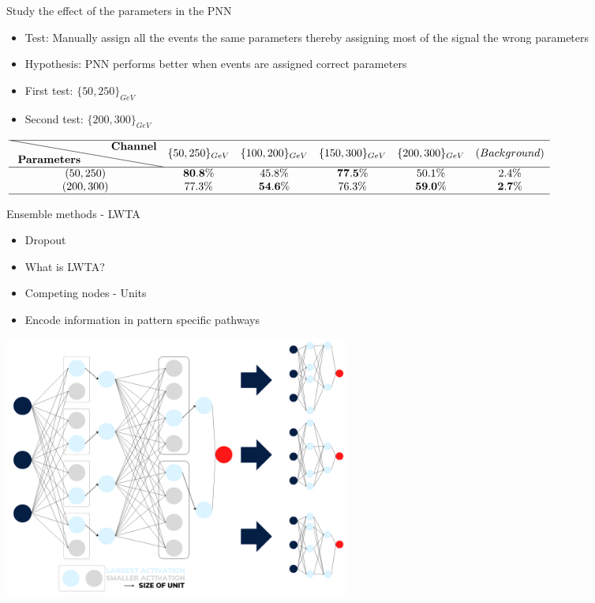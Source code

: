 \documentclass[UKenglish]{beamer}
\begin{document}
\begin{frame}{Study the effect of the parameters in the PNN}
    \begin{itemize}
        \item Test: Manually assign all the events the same parameters thereby assigning
        most of the signal the wrong parameters
        \item Hypothesis: PNN performs better when events are assigned correct
        parameters 
        \item First test: $\{50,250\}_{GeV}$
        \item Second test: $\{200,300\}_{GeV}$
    \end{itemize}
    \begin{table}
        \tiny
        \centering
        $
        \begin{array}{cccccc}
            \hline \text { \diagbox{\textbf{Parameters}}{\textbf{Channel}} }  & \text {$\{50,250\}_{GeV}$} & \text {$\{100,200\}_{GeV}$} & \text {$\{150,300\}_{GeV}$} & \text {$\{200,300\}_{GeV}$} & \text {$(Background)$} \\
            \hline \text {$(50,250)$}   & \text { $\bf{80.8}\%$ } & \text { $45.8\%$ } & \text { $\bf{77.5}\%$ } & \text { $50.1\%$ } & \text { $2.4\%$ }  \\
            \text {$(200,300)$}   & \text { $77.3\%$ } & \text { $\bf{54.6}\%$ } & \text { $76.3\%$ } & \text { $\bf{59.0}\%$ } & \text { $\bf{2.7}\%$ }\\
            \hline
        \end{array}
        $
    \end{table}
\end{frame}

\begin{frame}{Ensemble methods - LWTA}
    \begin{itemize}
        \item Dropout
        \item What is LWTA?
        \item Competing nodes - Units
        \item Encode information in pattern specific pathways
    \end{itemize}    
    \centering
    \includegraphics[width = 0.5\textwidth]{figures/Max_out}
\end{frame}
\end{document}
